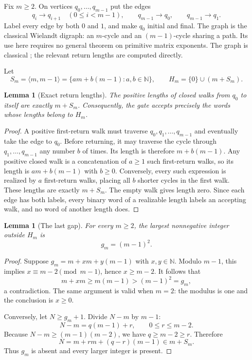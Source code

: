 \documentclass[11pt,letterpaper]{article}
\newtheorem{lemma}[theorem]{Lemma}
\theoremstyle{definition}
\theoremstyle{remark}
\newcommand{\N}{\mathbb N}
\begin{document}
Fix $m\ge2$. On vertices $q_0,\ldots,q_{m-1}$ put the edges
\[
q_i\longrightarrow q_{i+1}\quad(0\le i<m-1),
\qquad
q_{m-1}\longrightarrow q_0,
\qquad
q_{m-1}\longrightarrow q_1.
\]
Label every edge by both $0$ and $1$, and make $q_0$ initial and final. The
graph is the classical Wielandt digraph: an $m$-cycle and an $(m-1)$-cycle
sharing a path. Its use here requires no general theorem on primitive matrix
exponents. The graph is classical \cite{Wielandt,Neufeld}; the relevant
return lengths are computed directly.

Let
\[
S_m=\langle m,m-1\rangle
=\{am+b(m-1):a,b\in\N\},
\qquad
H_m=\{0\}\cup(m+S_m).
\]

\begin{lemma}[Exact return lengths]\label{ccc:qr:lem:returns}
The positive lengths of closed walks from $q_0$ to itself are exactly
$m+S_m$. Consequently, the gate accepts precisely the words whose lengths
belong to $H_m$.
\end{lemma}
\begin{proof}
A positive first-return walk must traverse $q_0,q_1,\ldots,q_{m-1}$ and
eventually take the edge to $q_0$. Before returning, it may traverse the
cycle through $q_1,\ldots,q_{m-1}$ any number $b$ of times. Its length is
therefore $m+b(m-1)$. Any positive closed walk is a concatenation of $a\ge1$
such first-return walks, so its length is $am+b(m-1)$ with $b\ge0$.
Conversely, every such expression is realized by $a$ first-return walks,
placing all $b$ shorter cycles in the first walk. These lengths are exactly
$m+S_m$. The empty walk gives length zero. Since each edge has both labels,
every binary word of a realizable length labels an accepting walk, and no
word of another length does.
\end{proof}

\begin{lemma}[The last gap]\label{ccc:qr:lem:gap}
For every $m\ge2$, the largest nonnegative integer outside $H_m$ is
\[
g_m=(m-1)^2.
\]
\end{lemma}
\begin{proof}
Suppose $g_m=m+xm+y(m-1)$ with $x,y\in\N$. Modulo $m-1$, this implies
$x\equiv m-2\pmod{m-1}$, hence $x\ge m-2$. It follows that
\[
m+xm\ge m(m-1)>(m-1)^2=g_m,
\]
a contradiction. The same argument is valid when $m=2$: the modulus is one
and the conclusion is $x\ge0$.

Conversely, let $N\ge g_m+1$. Divide $N-m$ by $m-1$:
\[
N-m=q(m-1)+r,\qquad 0\le r\le m-2.
\]
Because $N-m\ge(m-1)(m-2)$, we have $q\ge m-2\ge r$. Therefore
\[
N=m+r m+(q-r)(m-1)\in m+S_m.
\]
Thus $g_m$ is absent and every larger integer is present.
\end{proof}
\end{document}
